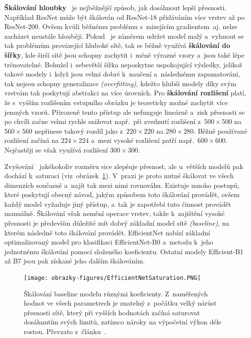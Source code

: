 \textbf{Škálování hloubky}~\cite{article:RethinkingEfficientNet} je nejběžnější způsob, jak dosáhnout lepší přesnosti. Například ResNet může být škálován od ResNet-18 přidáváním více vrstev až po ResNet-200. Ovšem kvůli běžnému problému s~mizejícím gradientem~aj. nelze zacházet neustále hlouběji. Pokud~\cite{website:RethinkingEfficientNet} je záměrem udržet model malý a~vyhnout se tak problémům provázející hluboké sítě, tak se běžně využívá \textbf{škálování do šířky}, kde širší sítě jsou schopny zachytit i~méně výrazné vzory a~jsou také lépe trénovatelné. Bohužel i~sebevětší šířka neposkytne uspokojující výsledky, jelikož takové modely i~když jsou velmi dobré k~naučení a~následnému zapamatování, tak nejsou schopny generalizace \emph{(overfitting)}, kdežto hlubší modely díky svým vrstvám tak poskytují abstrakci na více úrovních. Pro \textbf{škálování rozlišení} platí, že s~vyšším rozlišením vstupního obrázku je teoreticky možné zachytit více jemných vzorů. Přirozeně tento přístup ale nefunguje lineárně a~zisk přesnosti se po chvíli začne velmi rychle snižovat např.~při zvednutí rozlišení z~$500 \times 500$ na $560 \times 560$ nepřinese takový rozdíl jako z~$220 \times 220$ na $280 \times 280$. Běžně používané rozlišení začíná na $224 \times 224$ a~mezi vysoké rozlišení patří např.~$600 \times 600$. Nejčastěji se však využívá rozlišení $300 \times 300$.

Zvyšování~\cite{website:RethinkingEfficientNet, article:RethinkingEfficientNet} jakéhokoliv rozměru sice zlepšuje přesnost, ale u~větších modelů pak dochází k~saturaci (viz~obrázek~\ref{img:EfficientNetSaturation}). V~praxi je proto nutné škálovat ve všech dimenzích současně a~najít tak mezi nimi rovnováhu. Existuje mnoho postupů, které poskytují obecný návod, jakým způsobem toto škálování provádět, ovšem každý model vyžaduje jiný přístup, a~tak je zapotřebí tuto činnost provádět manuálně. Škálování však nemění operace vrstev, takže k~zajištění vysoké přesnosti je především důležité mít dobrý základní model sítě \emph{(baseline)}, na kterém následně toto škálování provádět. EfficientNet nabízí základní optimalizovaný model pro klasifikaci EfficientNet-B0 a~metodu k~jeho jednotnému škálování pomocí složeného koeficientu. Ostatní modely Efficient-B1 až B7 jsou pak získané jeho dalším škálováním.

\begin{figure}[hbt]
	\centering
	\setlength{\fboxsep}{0pt}
	\texttt{[image: obrazky-figures/EfficientNetSaturation.PNG]}
	\caption{Škálování baseline modelu různými koeficienty. Z~naměřených hodnot ve všech parametrech je znatelný z~počátku velký nárůst přesnosti sítě, který při vyšších hodnotách začíná saturovat dosáhnutím svých limitů, zatímco nároky na výpočetní výkon déle rostou. Převzato z~článku~\cite{article:RethinkingEfficientNet}.}
	\label{img:EfficientNetSaturation}
\end{figure}

